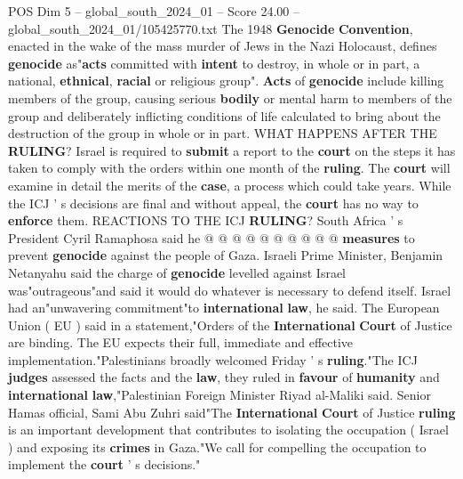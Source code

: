 \begin{textsample}{POS Dim 5 – global\_south\_2024\_01 – Score 24.00 – global\_south\_2024\_01/105425770.txt}
The 1948 \textbf{Genocide} \textbf{Convention}, enacted in the wake of the mass murder of Jews in the Nazi Holocaust, defines \textbf{genocide} as"\textbf{acts} committed with \textbf{intent} to destroy, in whole or in part, a national, \textbf{ethnical}, \textbf{racial} or religious group". \textbf{Acts} of \textbf{genocide} include killing members of the group, causing serious \textbf{bodily} or mental harm to members of the group and deliberately inflicting conditions of life calculated to bring about the destruction of the group in whole or in part.
WHAT HAPPENS AFTER THE \textbf{RULING}?
Israel is required to \textbf{submit} a report to the \textbf{court} on the steps it has taken to comply with the orders within one month of the \textbf{ruling}.
The \textbf{court} will examine in detail the merits of the \textbf{case}, a process which could take years.
While the ICJ ' s decisions are final and without appeal, the \textbf{court} has no way to \textbf{enforce} them.
REACTIONS TO THE ICJ \textbf{RULING}?
South Africa ' s President Cyril Ramaphosa said he @ @ @ @ @ @ @ @ @ @ \textbf{measures} to prevent \textbf{genocide} against the people of Gaza.
Israeli Prime Minister, Benjamin Netanyahu said the charge of \textbf{genocide} levelled against Israel was"outrageous"and said it would do whatever is necessary to defend itself.
Israel had an"unwavering commitment"to \textbf{international} \textbf{law}, he said.
The European Union ( EU ) said in a statement,"Orders of the \textbf{International} \textbf{Court} of Justice are binding.
The EU expects their full, immediate and effective implementation."Palestinians broadly welcomed Friday ' s \textbf{ruling}."The ICJ \textbf{judges} assessed the facts and the \textbf{law}, they ruled in \textbf{favour} of \textbf{humanity} and \textbf{international} \textbf{law},"Palestinian Foreign Minister Riyad al-Maliki said.
Senior Hamas official, Sami Abu Zuhri said"The \textbf{International} \textbf{Court} of Justice \textbf{ruling} is an important development that contributes to isolating the occupation ( Israel ) and exposing its \textbf{crimes} in Gaza."We call for compelling the occupation to implement the \textbf{court} ' s decisions."

\end{textsample}
